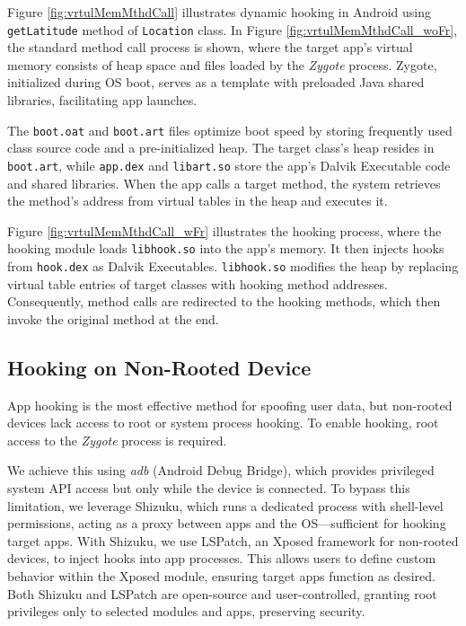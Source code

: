 Figure \ref{fig:vrtulMemMthdCall} illustrates dynamic hooking in Android using \texttt{getLatitude} method of \texttt{Location} class. In Figure \ref{fig:vrtulMemMthdCall_woFr}, the standard method call process is shown, where the target app's virtual memory consists of heap space and files loaded by the \textit{Zygote} process. Zygote, initialized during OS boot, serves as a template with preloaded Java shared libraries, facilitating app launches.

The \texttt{boot.oat} and \texttt{boot.art} files optimize boot speed by storing frequently used class source code and a pre-initialized heap. The target class's heap resides in \texttt{boot.art}, while \texttt{app.dex} and \texttt{libart.so} store the app's Dalvik Executable code and shared libraries. When the app calls a target method, the system retrieves the method's address from virtual tables in the heap and executes it.

Figure \ref{fig:vrtulMemMthdCall_wFr} illustrates the hooking process, where the hooking module loads \texttt{libhook.so} into the app's memory. It then injects hooks from \texttt{hook.dex} as Dalvik Executables. \texttt{libhook.so} modifies the heap by replacing virtual table entries of target classes with hooking method addresses. Consequently, method calls are redirected to the hooking methods, which then invoke the original method at the end.

% 

\subsection{Hooking on Non-Rooted Device}

App hooking is the most effective method for spoofing user data, but non-rooted devices lack access to root or system process hooking. To enable hooking, root access to the \textit{Zygote} process is required.

We achieve this using \textit{adb} (Android Debug Bridge), which provides privileged system API access but only while the device is connected. To bypass this limitation, we leverage Shizuku, which runs a dedicated process with shell-level permissions, acting as a proxy between apps and the OS—sufficient for hooking target apps. With Shizuku, we use LSPatch, an Xposed framework for non-rooted devices, to inject hooks into app processes. This allows users to define custom behavior within the Xposed module, ensuring target apps function as desired. Both Shizuku and LSPatch are open-source and user-controlled, granting root privileges only to selected modules and apps, preserving security.

